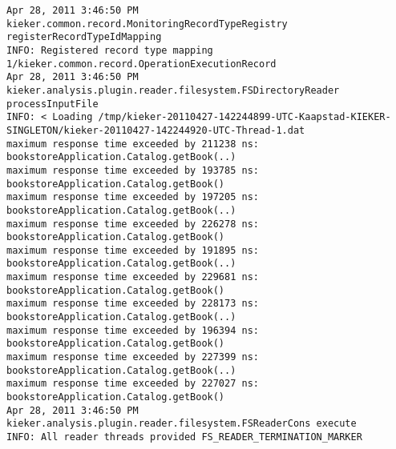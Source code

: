 \setTextListing
\begin{lstlisting}[caption=Execution of the example analysis (Section~\ref{sec:example:analysis})]
Apr 28, 2011 3:46:50 PM kieker.common.record.MonitoringRecordTypeRegistry registerRecordTypeIdMapping
INFO: Registered record type mapping 1/kieker.common.record.OperationExecutionRecord
Apr 28, 2011 3:46:50 PM kieker.analysis.plugin.reader.filesystem.FSDirectoryReader processInputFile
INFO: < Loading /tmp/kieker-20110427-142244899-UTC-Kaapstad-KIEKER-SINGLETON/kieker-20110427-142244920-UTC-Thread-1.dat
maximum response time exceeded by 211238 ns: bookstoreApplication.Catalog.getBook(..)
maximum response time exceeded by 193785 ns: bookstoreApplication.Catalog.getBook()
maximum response time exceeded by 197205 ns: bookstoreApplication.Catalog.getBook(..)
maximum response time exceeded by 226278 ns: bookstoreApplication.Catalog.getBook()
maximum response time exceeded by 191895 ns: bookstoreApplication.Catalog.getBook(..)
maximum response time exceeded by 229681 ns: bookstoreApplication.Catalog.getBook()
maximum response time exceeded by 228173 ns: bookstoreApplication.Catalog.getBook(..)
maximum response time exceeded by 196394 ns: bookstoreApplication.Catalog.getBook()
maximum response time exceeded by 227399 ns: bookstoreApplication.Catalog.getBook(..)
maximum response time exceeded by 227027 ns: bookstoreApplication.Catalog.getBook()
Apr 28, 2011 3:46:50 PM kieker.analysis.plugin.reader.filesystem.FSReaderCons execute
INFO: All reader threads provided FS_READER_TERMINATION_MARKER
\end{lstlisting}
